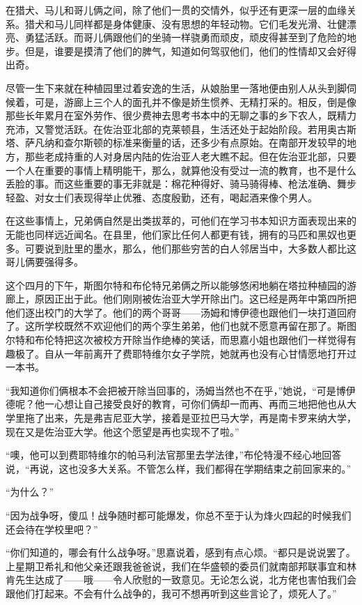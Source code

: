 \par 在猎犬、马儿和哥儿俩之间，除了他们一贯的交情外，似乎还有更深一层的血缘关系。猎犬和马儿同样都是身体健康、没有思想的年轻动物。它们毛发光滑、壮健漂亮、勇猛活跃。而哥儿俩跟他们的坐骑一样骁勇而顽皮，顽皮得甚至到了危险的地步。但是，谁要是摸清了他们的脾气，知道如何驾驭他们，他们的性情却又会好得出奇。
\par 尽管一生下来就在种植园里过着安逸的生活，从娘胎里一落地便由别人从头到脚伺候着，可是，游廊上三个人的面孔并不像是娇生惯养、无精打采的。相反，倒是像那些长年累月在室外劳作、很少费神去思考书本中的无聊之事的乡下农人，既精力充沛，又警觉活跃。在佐治亚北部的克莱顿县，生活还处于起始阶段。若用奥古斯塔、萨凡纳和查尔斯顿的标准来衡量的话，还多少有点原始。在南部开发较早的地方，那些老成持重的人对身居内陆的佐治亚人老大瞧不起。但在佐治亚北部，只要一个人在重要的事情上精明能干，那么，就算他没有受过一流的教育，也不是什么丢脸的事。而这些重要的事无非就是：棉花种得好、骑马骑得棒、枪法准确、舞步轻盈、对女士们表现得举止优雅、态度殷勤，还有，喝起酒来像个男人。
\par 在这些事情上，兄弟俩自然是出类拔萃的，可他们在学习书本知识方面表现出来的无能也同样远近闻名。在县里，他们家比任何人都更有钱，拥有的马匹和黑奴也更多。可要说到肚里的墨水，那么，他们那些穷苦的白人邻居当中，大多数人都比这哥儿俩要强得多。
\par 这个四月的下午，斯图尔特和布伦特兄弟俩之所以能够悠闲地躺在塔拉种植园的游廊上，原因正出于此。他们刚刚被佐治亚大学开除出门。这已经是两年中第四所把他们逐出校门的大学了。他们的两个哥哥——汤姆和博伊德也跟他们一块打道回府了。这所学校既然不欢迎他们的两个孪生弟弟，他们也就不愿意再留在那了。斯图尔特和布伦特把这次被校方开除当作绝棒的笑话，而思嘉小姐也跟他们一样觉得有趣极了。自从一年前离开了费耶特维尔女子学院，她就再也没有心甘情愿地打开过一本书。
\par “我知道你们俩根本不会把被开除当回事的，汤姆当然也不在乎，”她说，“可是博伊德呢？他一心想让自己接受良好的教育，可你们俩却一而再、再而三地把他也从大学里拖了出来，先是弗吉尼亚大学，接着是亚拉巴马大学，再是南卡罗来纳大学，现在又是佐治亚大学。他这个愿望是再也实现不了啦。”
\par “噢，他可以到费耶特维尔的帕马利法官那里去学法律，”布伦特漫不经心地回答说，“再说，这也没多大关系。不管怎么样，我们都得在学期结束之前回家来的。”
\par “为什么？”
\par “因为战争呀，傻瓜！战争随时都可能爆发，你总不至于认为烽火四起的时候我们还会待在学校里吧？”
\par “你们知道的，哪会有什么战争呀。”思嘉说着，感到有点心烦。“都只是说说罢了。上星期卫希礼和他父亲还跟我爸爸说，我们在华盛顿的委员们就南部邦联事宜和林肯先生达成了——哦——令人欣慰的一致意见。无论怎么说，北方佬也害怕我们会跟他们打起来。不会有什么战争的，我可不想再听到这些言论了，烦死人了。”
